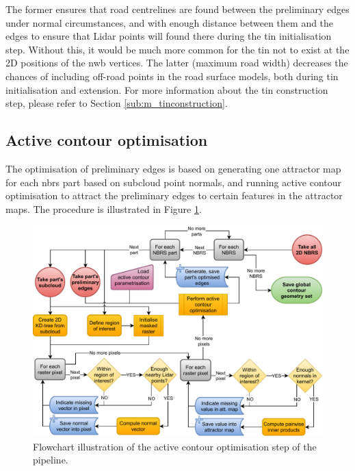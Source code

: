 The former ensures that road centrelines are found between the preliminary edges under normal circumstances, and with enough distance between them and the edges to ensure that Lidar points will found there during the \ac{tin} initialisation step. Without this, it would be much more common for the \ac{tin} not to exist at the 2D positions of the \ac{nwb} vertices. The latter (maximum road width) decreases the chances of including off-road points in the road surface models, both during \ac{tin} initialisation and extension. For more information about the \ac{tin} construction step, please refer to Section \ref{sub:m_tinconstruction}.

\subsection{Active contour optimisation}
\label{sub:m_activecontours}

The optimisation of preliminary edges is based on generating one attractor map for each \ac{nbrs} part based on subcloud point normals, and running active contour optimisation to attract the preliminary edges to certain features in the attractor maps. The procedure is illustrated in Figure \ref{fig:edgeoptimisationflow}.

\begin{figure}
    \centering
    \includegraphics[width=\linewidth]{final_report/figs/edge_optimisation.pdf}
    \caption[Flowchart illustrating of the active contour optimisation step]{Flowchart illustration of the active contour optimisation step of the pipeline.}
    \label{fig:edgeoptimisationflow}
\end{figure}

